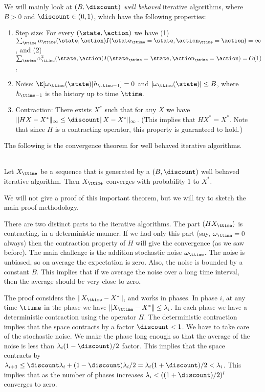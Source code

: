 We will mainly look at {\em $(B,\discount)$ well behaved} iterative
algorithms, where $B>0$ and $\discount\in(0,1)$, which have the
following properties:
\begin{enumerate}
\item Step size: For every $(\state,\action)$ we have (1) $\sum_\ttime
\alpha_\ttime(\state,\action)
I(\state_\ttime=\state,\action_\ttime=\action)=\infty $, and (2)
$\sum_\ttime \alpha_\ttime^2(\state,\action)
I(\state_\ttime=\state,\action_\ttime=\action)=O(1)$,
\item Noise: $\E[\omega_\ttime(\state)|h_{\ttime-1}]=0$ and $|\omega_\ttime(\state)|\leq B$, where
$h_{\ttime-1}$ is the history up to time $\ttime$.
\item Contraction: There exists $X^*$ such that for any $X$ we have $\|HX-X^*\|_\infty
\leq \discount \|X-X^*\|_\infty$. (This implies that $HX^*=X^*$.
Note that since $H$ is a contracting operator, this property is
guaranteed to hold.)
\end{enumerate}

The following is the convergence theorem for well behaved iterative
algorithms.

\begin{theorem}\ \\
\label{thm:stoch-approx}
 Let $X_\ttime$ be a sequence that is generated by a
$(B,\discount)$ well behaved iterative algorithm. Then $X_\ttime$
converges with probability $1$ to $X^*$.
\end{theorem}

We will not give a proof of this important theorem, but we will try
to sketch the main proof methodology.

There are two distinct parts to the iterative algorithms. The part
$(HX_\ttime)$ is contracting, in a deterministic manner. If we had
only this part (say, $\omega_\ttime=0$ always) then the contraction
property of $H$ will give the convergence (as we saw before). The
main challenge is the addition stochastic noise $\omega_\ttime$. The
noise is unbiased, so on average the expectation is zero. Also, the
noise is bounded by a constant $B$. This implies that if we average
the noise over a long time interval, then the average should be very
close to zero.

The proof considers the $\|X_\ttime-X^*\|$, and  works in phases. In
phase $i$, at any time $\ttime$ in the phase we have
$\|X_\ttime-X^*\|\leq \lambda_i$.
%
In each phase we have a deterministic contraction using the operator
$H$. The deterministic contraction implies that
the space contracts by a factor $\discount<1$. We have to take care
of the stochastic noise. We make the phase long enough so that the
average of the noise is less than $\lambda_i (1-\discount)/2$ factor. This
implies that the space contracts by
$\lambda_{i+1}\leq\discount\lambda_i+(1-\discount)\lambda_i/2=\lambda_i(1+\discount)/2<\lambda_i $. This implies
that as the number of phases increases $\lambda_i<
((1+\discount)/2)^i$ converges to zero.

